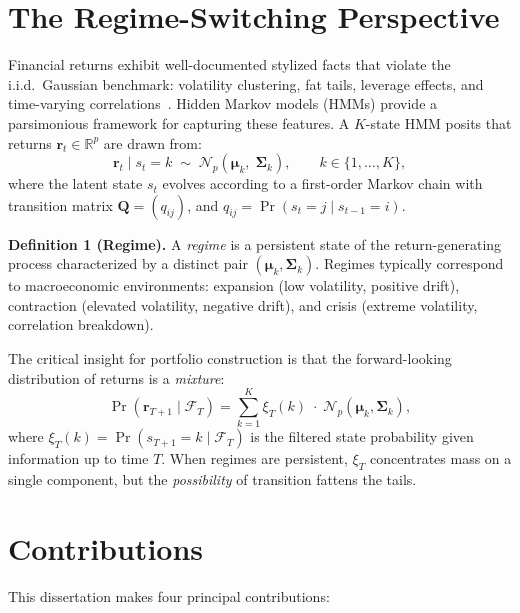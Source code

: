 \documentclass[12pt,oneside]{book}
\begin{document}
\section{The Regime-Switching Perspective}

Financial returns exhibit well-documented stylized facts that violate the i.i.d.\ Gaussian benchmark: volatility clustering, fat tails, leverage effects, and time-varying correlations~\cite{cont2001}. Hidden Markov models (HMMs) provide a parsimonious framework for capturing these features. A $K$-state HMM posits that returns $\mathbf{r}_t \in \mathbb{R}^p$ are drawn from:
\begin{equation}
\mathbf{r}_t \mid s_t = k \;\sim\; \mathcal{N}_p\!\left(\boldsymbol{\mu}_k,\; \boldsymbol{\Sigma}_k\right), \qquad k \in \{1,\dots,K\},
\label{eq:hmm}
\end{equation}
where the latent state $s_t$ evolves according to a first-order Markov chain with transition matrix $\mathbf{Q} = (q_{ij})$, and $q_{ij} = \Pr(s_t = j \mid s_{t-1} = i)$.

\begin{definitionbox}
\textbf{Definition 1 (Regime).} A \textit{regime} is a persistent state of the return-generating process characterized by a distinct pair $(\boldsymbol{\mu}_k, \boldsymbol{\Sigma}_k)$. Regimes typically correspond to macroeconomic environments: expansion (low volatility, positive drift), contraction (elevated volatility, negative drift), and crisis (extreme volatility, correlation breakdown).
\end{definitionbox}

The critical insight for portfolio construction is that the forward-looking distribution of returns is a \textit{mixture}:
\begin{equation}
\Pr(\mathbf{r}_{T+1} \mid \mathcal{F}_T) = \sum_{k=1}^{K} \xi_{T}(k) \;\cdot\; \mathcal{N}_p(\boldsymbol{\mu}_k, \boldsymbol{\Sigma}_k),
\label{eq:mixture}
\end{equation}
where $\xi_T(k) = \Pr(s_{T+1}=k \mid \mathcal{F}_T)$ is the filtered state probability given information up to time $T$. When regimes are persistent, $\xi_T$ concentrates mass on a single component, but the \textit{possibility} of transition fattens the tails.

\section{Contributions}

This dissertation makes four principal contributions:
\end{document}
